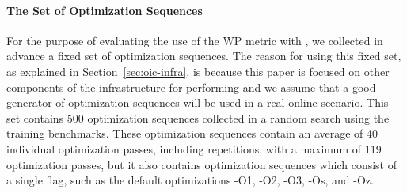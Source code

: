 \paragraph{The Set of Optimization Sequences}
For the purpose of evaluating the use of the WP metric with {\itercomp}, we collected in advance a fixed set of optimization sequences.
The reason for using this fixed set, as explained in Section~\ref{sec:oic-infra}, is because this paper is focused on other components of the infrastructure for performing {\itercomp} and we assume that a good generator of optimization sequences will be used in a real online scenario.
This set contains 500 optimization sequences collected in a random search using the training benchmarks.
These optimization sequences contain an average of 40 individual optimization passes, including repetitions, with a maximum of 119 optimization passes, but it also contains optimization sequences which consist of a single flag, such as the default optimizations {\flagstype -O1}, {\flagstype -O2}, {\flagstype -O3}, {\flagstype -Os}, and {\flagstype -Oz}.



